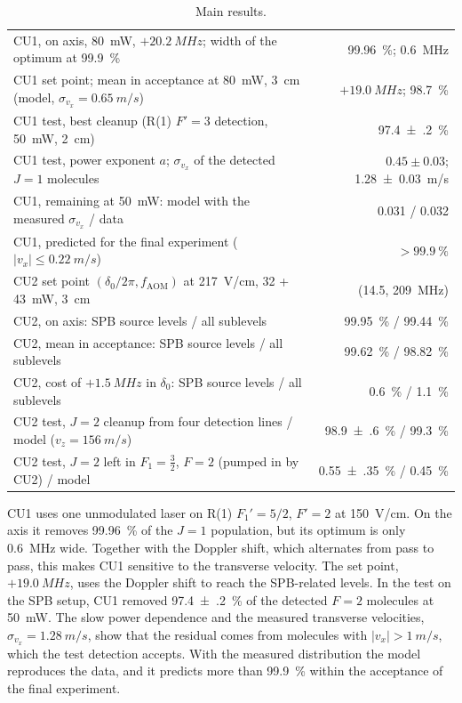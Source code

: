 \documentclass[11pt,a4paper,oneside]{report}
\newcommand{\fAOM}{f_{\mathrm{AOM}}}
\begin{document}
\begin{table}[htbp]
  \centering
  \caption{Main results.}
  \label{tab:summary}
  \small
  \begin{tabularx}{\textwidth}{Lr}
    \toprule
    CU1, on axis, \SI{80}{mW}, $+\SI{20.2}{MHz}$; width of the optimum at \SI{99.9}{\percent} & \SI{99.96}{\percent}; \SI{0.6}{MHz} \\
    CU1 set point; mean in acceptance at \SI{80}{mW}, \SI{3}{cm} (model, $\sigma_{v_x}=\SI{0.65}{m/s}$) & $+\SI{19.0}{MHz}$; \SI{98.7}{\percent} \\
    CU1 test, best cleanup (R(1) $F'=3$ detection, \SI{50}{mW}, \SI{2}{cm}) & \SI{97.4(2)}{\percent} \\
    CU1 test, power exponent $a$; $\sigma_{v_x}$ of the detected $J=1$ molecules & $0.45\pm0.03$; \SI{1.28(3)}{m/s} \\
    CU1, remaining at \SI{50}{mW}: model with the measured $\sigma_{v_x}$ / data & 0.031 / 0.032 \\
    CU1, predicted for the final experiment ($|v_x|\leq\SI{0.22}{m/s}$) & $>\SI{99.9}{\percent}$ \\
    CU2 set point $(\delta_0/2\pi,\fAOM)$ at \SI{217}{V/cm}, 32 + \SI{43}{mW}, \SI{3}{cm} & (14.5, \SI{209}{MHz}) \\
    CU2, on axis: SPB source levels / all sublevels & \SI{99.95}{\percent} / \SI{99.44}{\percent} \\
    CU2, mean in acceptance: SPB source levels / all sublevels & \SI{99.62}{\percent} / \SI{98.82}{\percent} \\
    CU2, cost of $+\SI{1.5}{MHz}$ in $\delta_0$: SPB source levels / all sublevels & \SI{0.6}{\percent} / \SI{1.1}{\percent} \\
    CU2 test, $J=2$ cleanup from four detection lines / model ($v_z=\SI{156}{m/s}$) & \SI{98.9(6)}{\percent} / \SI{99.3}{\percent} \\
    CU2 test, $J=2$ left in $F_1=\tfrac32$, $F=2$ (pumped in by CU2) / model & \SI{0.55(35)}{\percent} / \SI{0.45}{\percent} \\
    \bottomrule
  \end{tabularx}
\end{table}

CU1 uses one unmodulated laser on R(1) $F_1'=5/2$, $F'=2$ at \SI{150}{V/cm}. On the axis it removes
\SI{99.96}{\percent} of the $J=1$ population, but its optimum is only \SI{0.6}{MHz} wide. Together
with the Doppler shift, which alternates from pass to pass, this makes CU1 sensitive to the
transverse velocity. The set point, $+\SI{19.0}{MHz}$, uses the Doppler shift to reach the SPB-related levels.
In the test on the SPB setup, CU1 removed \SI{97.4(2)}{\percent} of the detected $F=2$ molecules at
\SI{50}{mW}. The slow power dependence and the measured transverse velocities,
$\sigma_{v_x}=\SI{1.28}{m/s}$, show that the residual comes from molecules with
$|v_x|>\SI{1}{m/s}$, which the test detection accepts. With the measured distribution the model
reproduces the data, and it predicts more than \SI{99.9}{\percent} within the acceptance of the final
experiment.
\end{document}
